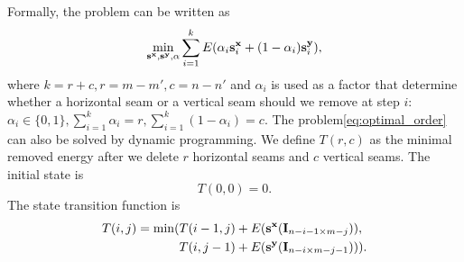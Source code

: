 \documentclass[final]{cvpr}
\begin{document}
Formally, the problem can be written as
\begin{equation}
    \min\limits_{\textbf s^\textbf x,\textbf s^\textbf y,\alpha}\sum_{i=1}^k E(\alpha_i\textbf s_i^\textbf x+(1-\alpha_i)\textbf s_i^\textbf y),
    \label{eq:optimal_order}
\end{equation}
where $k=r+c,r=m-m',c=n-n'$ and $\alpha_i$ is used as a factor that determine whether a horizontal seam or a vertical seam should we remove at step $i$: $\alpha_i\in\{0,1\},\sum_{i=1}^k\alpha_i=r,\sum_{i=1}^k(1-\alpha_i)=c$.
The problem\ref{eq:optimal_order} can also be solved by dynamic programming.
We define $T(r,c)$ as the minimal removed energy after we delete $r$ horizontal seams and $c$ vertical seams.
The initial state is
\begin{equation}
    T(0,0)=0.
    \label{eq:T_initial_state}
\end{equation}
The state transition function is
\begin{equation}
    \begin{aligned}
        T(i,j)=\min(&T(i-1,j)+E(\textbf s^\textbf x(\textbf I_{n-i-1\times m-j})),\\
        &T(i,j-1)+E(\textbf s^\textbf y(\textbf I_{n-i\times m-j-1}))).
    \end{aligned}
    \label{eq:T_transition_function}
\end{equation}
\end{document}
